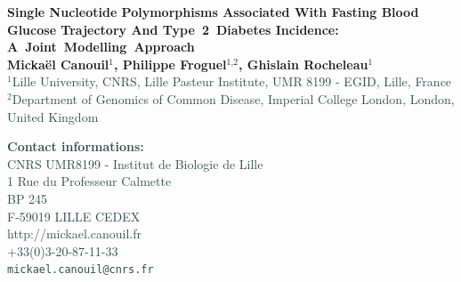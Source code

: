 \documentclass[10pt,a0,portrait]{a0poster}
\newcommand{\superscript}[1]{\ensuremath{^{\textrm{#1}}}}
\begin{document}
\Large

\begin{minipage}[t]{0.60\linewidth}
\flushleft
{\huge \textcolor{ku}{{\textbf{\mbox{Single} \mbox{Nucleotide} \mbox{Polymorphisms} \mbox{Associated} \mbox{With} \mbox{Fasting} \mbox{Blood} \mbox{Glucose} \mbox{Trajectory} \mbox{And} \mbox{Type 2 Diabetes} \mbox{Incidence:} \mbox{\linebreak \mbox{A Joint Modelling Approach}}}}}}\\ %
\vspace{1cm}
{\large \textbf{Mickaël Canouil\superscript{1}, Philippe Froguel\superscript{1,2}, Ghislain Rocheleau\superscript{1}}\\[0.5cm] %
\textcolor{DarkSlateGray}{
\superscript{1}Lille University, CNRS, Lille Pasteur Institute, UMR 8199 - EGID, Lille, France\\
\superscript{2}Department of Genomics of Common Disease, Imperial College London, London, United Kingdom\\
}}
\end{minipage}
%
\begin{minipage}[t]{0.40\linewidth}
\flushright
\textcolor{DarkSlateGray}{
{\large \textbf{Contact informations:}\\
CNRS UMR8199 - Institut de Biologie de Lille\\
1 Rue du Professeur Calmette\\
BP 245\\
F-59019 LILLE CEDEX\\[0.45cm]
http://mickael.canouil.fr\\
+33(0)3-20-87-11-33\\
\texttt{mickael.canouil@cnrs.fr}}
}
\end{minipage}

\end{document}
